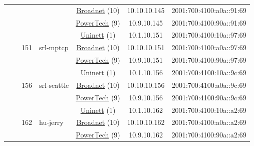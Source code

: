 \begin{small}
\begin{center}
\begin{longtable}{|c|c|c|c|c|c|c|c|}
  &  &  &  & \multicolumn{2}{|c|}{\tiny{\href{https://www.broadnet.no}{Broadnet} (10)}} & \tiny{10.10.10.145} & \tiny{2001:700:4100:a0a::91:69} \\* \cline{5-5}\cline{6-6}\cline{7-7}\cline{8-8}
  &  &  &  & \multicolumn{2}{|c|}{\tiny{\href{http://www.powertech.no}{PowerTech} (9)}} & \tiny{10.9.10.145} & \tiny{2001:700:4100:90a::91:69} \\* \cline{3-3}\cline{4-4}\cline{5-5}\cline{6-6}\cline{7-7}\cline{8-8}
  &  & \multirow{3}{*}{\tiny{151}} & \multicolumn{1}{|l|}{\multirow{3}{*}{\tiny{srl-mptcp}}} & \multicolumn{2}{|c|}{\tiny{\href{https://www.uninett.no}{Uninett} (1)}} & \tiny{10.1.10.151} & \tiny{2001:700:4100:10a::97:69} \\* \cline{5-5}\cline{6-6}\cline{7-7}\cline{8-8}
  &  &  &  & \multicolumn{2}{|c|}{\tiny{\href{https://www.broadnet.no}{Broadnet} (10)}} & \tiny{10.10.10.151} & \tiny{2001:700:4100:a0a::97:69} \\* \cline{5-5}\cline{6-6}\cline{7-7}\cline{8-8}
  &  &  &  & \multicolumn{2}{|c|}{\tiny{\href{http://www.powertech.no}{PowerTech} (9)}} & \tiny{10.9.10.151} & \tiny{2001:700:4100:90a::97:69} \\* \cline{3-3}\cline{4-4}\cline{5-5}\cline{6-6}\cline{7-7}\cline{8-8}
  &  & \multirow{3}{*}{\tiny{156}} & \multicolumn{1}{|l|}{\multirow{3}{*}{\tiny{srl-seattle}}} & \multicolumn{2}{|c|}{\tiny{\href{https://www.uninett.no}{Uninett} (1)}} & \tiny{10.1.10.156} & \tiny{2001:700:4100:10a::9c:69} \\* \cline{5-5}\cline{6-6}\cline{7-7}\cline{8-8}
  &  &  &  & \multicolumn{2}{|c|}{\tiny{\href{https://www.broadnet.no}{Broadnet} (10)}} & \tiny{10.10.10.156} & \tiny{2001:700:4100:a0a::9c:69} \\* \cline{5-5}\cline{6-6}\cline{7-7}\cline{8-8}
  &  &  &  & \multicolumn{2}{|c|}{\tiny{\href{http://www.powertech.no}{PowerTech} (9)}} & \tiny{10.9.10.156} & \tiny{2001:700:4100:90a::9c:69} \\* \cline{3-3}\cline{4-4}\cline{5-5}\cline{6-6}\cline{7-7}\cline{8-8}
  &  & \multirow{3}{*}{\tiny{162}} & \multicolumn{1}{|l|}{\multirow{3}{*}{\tiny{hu-jerry}}} & \multicolumn{2}{|c|}{\tiny{\href{https://www.uninett.no}{Uninett} (1)}} & \tiny{10.1.10.162} & \tiny{2001:700:4100:10a::a2:69} \\* \cline{5-5}\cline{6-6}\cline{7-7}\cline{8-8}
  &  &  &  & \multicolumn{2}{|c|}{\tiny{\href{https://www.broadnet.no}{Broadnet} (10)}} & \tiny{10.10.10.162} & \tiny{2001:700:4100:a0a::a2:69} \\* \cline{5-5}\cline{6-6}\cline{7-7}\cline{8-8}
  &  &  &  & \multicolumn{2}{|c|}{\tiny{\href{http://www.powertech.no}{PowerTech} (9)}} & \tiny{10.9.10.162} & \tiny{2001:700:4100:90a::a2:69} \\ \hline
\end{longtable}
\end{center}
\end{small}



